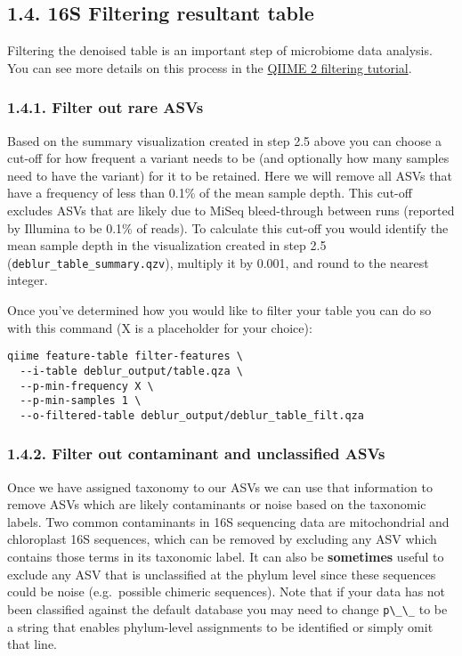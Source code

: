 \documentclass[
]{book}
\begin{document}
\subsection{1.4. 16S Filtering resultant table}\label{s-filtering-resultant-table}

Filtering the denoised table is an important step of microbiome data analysis. You can see more details on this process in the \href{https://docs.qiime2.org/2022.11/tutorials/filtering/}{QIIME 2 filtering tutorial}.

\subsubsection{1.4.1. Filter out rare ASVs}\label{filter-out-rare-asvs}

Based on the summary visualization created in step 2.5 above you can choose a cut-off for how frequent a variant needs to be (and optionally how many samples need to have the variant) for it to be retained. Here we will remove all ASVs that have a frequency of less than 0.1\% of the mean sample depth. This cut-off excludes ASVs that are likely due to MiSeq bleed-through between runs (reported by Illumina to be 0.1\% of reads). To calculate this cut-off you would identify the mean sample depth in the visualization created in step 2.5 (\texttt{deblur\_table\_summary.qzv}), multiply it by 0.001, and round to the nearest integer.

Once you've determined how you would like to filter your table you can do so with this command (X is a placeholder for your choice):

\begin{verbatim}
qiime feature-table filter-features \
  --i-table deblur_output/table.qza \
  --p-min-frequency X \
  --p-min-samples 1 \
  --o-filtered-table deblur_output/deblur_table_filt.qza
\end{verbatim}

\subsubsection{1.4.2. Filter out contaminant and unclassified ASVs}\label{filter-out-contaminant-and-unclassified-asvs}

Once we have assigned taxonomy to our ASVs we can use that information to remove ASVs which are likely contaminants or noise based on the taxonomic labels. Two common contaminants in 16S sequencing data are mitochondrial and chloroplast 16S sequences, which can be removed by excluding any ASV which contains those terms in its taxonomic label. It can also be \textbf{sometimes} useful to exclude any ASV that is unclassified at the phylum level since these sequences could be noise (e.g.~possible chimeric sequences). Note that if your data has not been classified against the default database you may need to change \texttt{p\textbackslash{}\_\textbackslash{}\_} to be a string that enables phylum-level assignments to be identified or simply omit that line.
\end{document}
